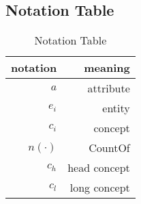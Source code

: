 \subsection{Notation Table}
\begin{table}[htbp]
  \centering
  \caption{Notation Table}
    \begin{tabular}{rr}
    \toprule
    notation & meaning \\
    \midrule
    $a$     & attribute \\
    $e_i$  & entity \\
    $c_i$  & concept \\
    $n(\cdot)$  & CountOf \\
    $c_h$  & head concept \\
    $c_l$  & long concept \\
    \bottomrule
    \end{tabular}%
  \label{tab:notation}%
\end{table}%


%
%
%
%
%
%
%
%
%
%
%
%
%
